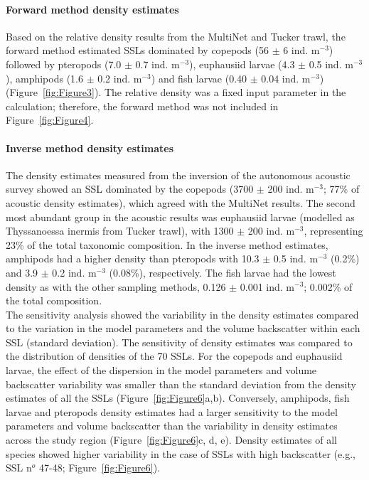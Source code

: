 \paragraph{Forward method density estimates}
Based on the relative density results from the MultiNet and Tucker trawl, the forward method estimated SSLs dominated by copepods (56 $\pm$ 6 ind. m$^{-3}$) followed by pteropods (7.0 $\pm$ 0.7 ind. m$^{-3}$), euphausiid larvae (4.3 $\pm$ 0.5 ind. m$^{-3}$), amphipods (1.6 $\pm$ 0.2 ind. m$^{-3}$) and fish larvae (0.40 $\pm$ 0.04 ind. m$^{-3}$) (Figure~\ref{fig:Figure3}). The relative density was a fixed input parameter in the calculation; therefore, the forward method was not included in Figure~\ref{fig:Figure4}.
\paragraph{Inverse method density estimates}
The density estimates measured from the inversion of the autonomous acoustic survey showed an SSL dominated by the copepods (3700 $\pm$ 200 ind. m$^{-3}$; 77\% of acoustic density estimates), which agreed with the MultiNet results. The second most abundant group in the acoustic results was euphausiid larvae (modelled as Thyssanoessa inermis from Tucker trawl), with 1300 $\pm$ 200 ind. m$^{-3}$, representing 23\% of the total taxonomic composition. In the inverse method estimates, amphipods had a higher density than pteropods with 10.3 $\pm$ 0.5 ind. m$^{-3}$ (0.2\%) and 3.9 $\pm$ 0.2 ind. m$^{-3}$ (0.08\%), respectively. The fish larvae had the lowest density as with the other sampling methods, 0.126 $\pm$ 0.001 ind. m$^{-3}$; 0.002\% of the total composition.\\
The sensitivity analysis showed the variability in the density estimates compared to the variation in the model parameters and the volume backscatter within each SSL (standard deviation). The sensitivity of density estimates was compared to the distribution of densities of the 70 SSLs. For the copepods and euphausiid larvae, the effect of the dispersion in the model parameters and volume backscatter variability was smaller than the standard deviation from the density estimates of all the SSLs (Figure~\ref{fig:Figure6}a,b). Conversely, amphipods, fish larvae and pteropods density estimates had a larger sensitivity to the model parameters and volume backscatter than the variability in density estimates across the study region (Figure~\ref{fig:Figure6}c, d, e). Density estimates of all species showed higher variability in the case of SSLs with high backscatter (e.g., SSL n$^{o}$ 47-48; Figure~\ref{fig:Figure6}).
 
